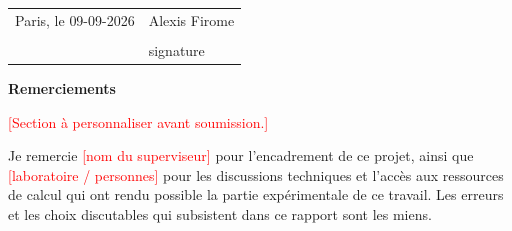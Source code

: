 \vspace{2.5cm}

\noindent
\begin{tabular}{@{}p{7cm}p{7cm}@{}}
{Paris}, le {09-09-2026} & \hfill Alexis Firome\\[1.6cm]
& \hrulefill\\
& \hfill\small signature\\
\end{tabular}

\vspace{\fill}

\cleardoublepage
\thispagestyle{empty}
\vspace*{3cm}
\begin{center}
{\Large\bfseries Remerciements}
\end{center}
\vspace{1cm}

\noindent
\textcolor{red}{[Section à personnaliser avant soumission.]}

\vspace{0.5cm}

\noindent
Je remercie \textcolor{red}{[nom du superviseur]} pour l'encadrement de ce
projet, ainsi que \textcolor{red}{[laboratoire / personnes]} pour les
discussions techniques et l'accès aux ressources de calcul qui ont rendu
possible la partie expérimentale de ce travail. Les erreurs et les choix
discutables qui subsistent dans ce rapport sont les miens.

\vspace{\fill}
